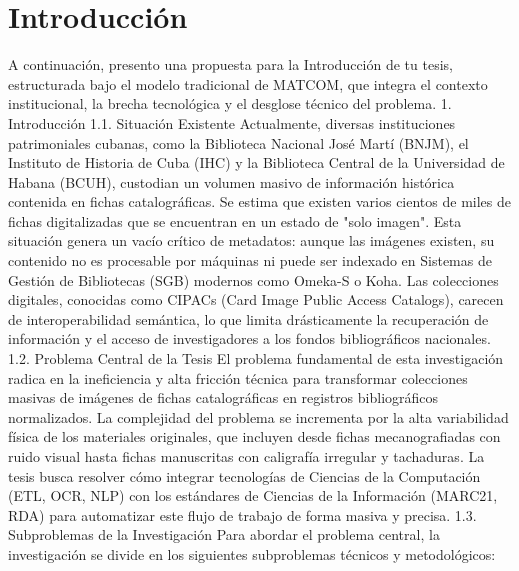 \chapter*{Introducción}\label{chapter:introduction}

A continuación, presento una propuesta para la Introducción de tu tesis, estructurada bajo el modelo tradicional de MATCOM, que integra el contexto institucional, la brecha tecnológica y el desglose técnico del problema.
1. Introducción
1.1. Situación Existente
Actualmente, diversas instituciones patrimoniales cubanas, como la Biblioteca Nacional José Martí (BNJM), el Instituto de Historia de Cuba (IHC) y la Biblioteca Central de la Universidad de Habana (BCUH), custodian un volumen masivo de información histórica contenida en fichas catalográficas. Se estima que existen varios cientos de miles de fichas digitalizadas que se encuentran en un estado de "solo imagen".
Esta situación genera un vacío crítico de metadatos: aunque las imágenes existen, su contenido no es procesable por máquinas ni puede ser indexado en Sistemas de Gestión de Bibliotecas (SGB) modernos como Omeka-S o Koha. Las colecciones digitales, conocidas como CIPACs (Card Image Public Access Catalogs), carecen de interoperabilidad semántica, lo que limita drásticamente la recuperación de información y el acceso de investigadores a los fondos bibliográficos nacionales.
1.2. Problema Central de la Tesis
El problema fundamental de esta investigación radica en la ineficiencia y alta fricción técnica para transformar colecciones masivas de imágenes de fichas catalográficas en registros bibliográficos normalizados.
La complejidad del problema se incrementa por la alta variabilidad física de los materiales originales, que incluyen desde fichas mecanografiadas con ruido visual hasta fichas manuscritas con caligrafía irregular y tachaduras. La tesis busca resolver cómo integrar tecnologías de Ciencias de la Computación (ETL, OCR, NLP) con los estándares de Ciencias de la Información (MARC21, RDA) para automatizar este flujo de trabajo de forma masiva y precisa.
1.3. Subproblemas de la Investigación
Para abordar el problema central, la investigación se divide en los siguientes subproblemas técnicos y metodológicos:

